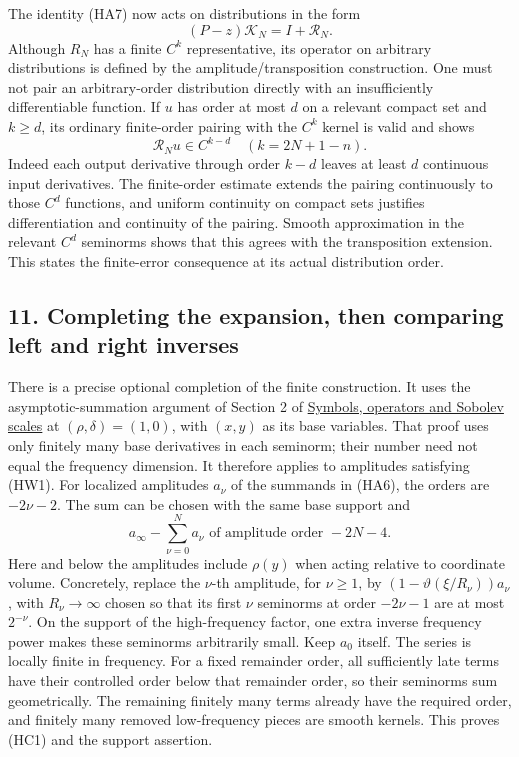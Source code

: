 \documentclass[
  11pt,
]{article}
\begin{document}
The identity (HA7) now acts on distributions in the form \[
                       (P-z)\mathcal K_N=I+\mathcal R_N.      \tag{HW8}
\] Although \(R_N\) has a finite \(C^k\) representative, its operator on
arbitrary distributions is defined by the amplitude/transposition
construction. One must not pair an arbitrary-order distribution directly
with an insufficiently differentiable function. If \(u\) has order at
most \(d\) on a relevant compact set and \(k\geq d\), its ordinary
finite-order pairing with the \(C^k\) kernel is valid and shows \[
                        \mathcal R_Nu\in C^{k-d}
                              \quad(k=2N+1-n).                \tag{HW9}
\] Indeed each output derivative through order \(k-d\) leaves at least
\(d\) continuous input derivatives. The finite-order estimate extends
the pairing continuously to those \(C^d\) functions, and uniform
continuity on compact sets justifies differentiation and continuity of
the pairing. Smooth approximation in the relevant \(C^d\) seminorms
shows that this agrees with the transposition extension. This states the
finite-error consequence at its actual distribution order.

\subsection{11. Completing the expansion, then comparing left and right
inverses}\label{completing-the-expansion-then-comparing-left-and-right-inverses}

There is a precise optional completion of the finite construction. It
uses the asymptotic-summation argument of Section 2 of
\href{euclidean-symbol-calculus.pdf}{Symbols, operators and Sobolev
scales} at \((\rho,\delta)=(1,0)\), with \((x,y)\) as its base
variables. That proof uses only finitely many base derivatives in each
seminorm; their number need not equal the frequency dimension. It
therefore applies to amplitudes satisfying (HW1). For localized
amplitudes \(a_\nu\) of the summands in (HA6), the orders are
\(-2\nu-2\). The sum can be chosen with the same base support and \[
       a_\infty-\sum_{\nu=0}^{N}a_\nu
                 \text{ of amplitude order }-2N-4.           \tag{HC1}
\] Here and below the amplitudes include \(\rho(y)\) when acting
relative to coordinate volume. Concretely, replace the \(\nu\)-th
amplitude, for \(\nu\geq1\), by \((1-\vartheta(\xi/R_\nu))a_\nu\), with
\(R_\nu\to\infty\) chosen so that its first \(\nu\) seminorms at order
\(-2\nu-1\) are at most \(2^{-\nu}\). On the support of the
high-frequency factor, one extra inverse frequency power makes these
seminorms arbitrarily small. Keep \(a_0\) itself. The series is locally
finite in frequency. For a fixed remainder order, all sufficiently late
terms have their controlled order below that remainder order, so their
seminorms sum geometrically. The remaining finitely many terms already
have the required order, and finitely many removed low-frequency pieces
are smooth kernels. This proves (HC1) and the support assertion.
\end{document}
